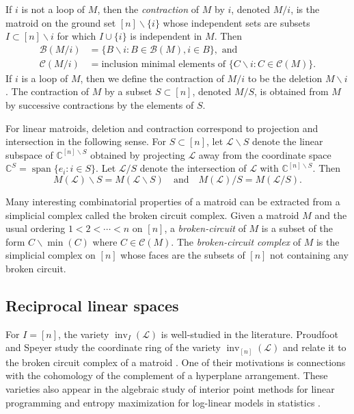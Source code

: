 \documentclass[ALCO,ThmDefs,Unicode,epreuves]{cedram}
\newcommand{\Cbb}{\mathbb{C}}
\newcommand{\cL}{\mathcal{L}}
\newcommand{\CC}{\mathcal{C}}
\newcommand{\B}{\mathcal{B}}
\DeclareMathOperator{\inv}{inv}
\DeclareMathOperator{\spanrm}{span}
\newcommand{\reldp}{\mathrel{:}}
\begin{document}
If $i$ is not a loop of $M$, then the \emph{contraction} of $M$ by $i$, denoted $M/ i $, is the matroid
on the ground set $[n]\backslash \{i\}$ whose independent sets are subsets $I\subset [n]\backslash i$ 
for which $I\cup \{i\}$ is independent in $M$. 
Then 
\begin{align*}
\B(M/ i) &= \{B\backslash i \reldp B \in \B (M), i\in B \}, \text{ and } \\
\CC (M/ i) & = \text{inclusion minimal elements of }\{C\backslash i \reldp C\in \CC (M) \}. 
\end{align*}
If $i$ is a loop of $M$, then we define the contraction of $M/i$ to be the deletion $M\backslash i$. 
The contraction of $M$ by a subset $S\subset [n]$, denoted $M/ S$, is obtained from $M$ by 
successive contractions by the elements of $S$. 


For linear matroids, deletion and contraction correspond to projection and intersection in the following sense. 
For $S\subset [n]$, let $\cL\backslash S$ denote the linear subspace of $\Cbb^{[n]\backslash S}$ obtained by projecting $\cL$ away 
from the coordinate space $\Cbb^S = \spanrm \{e_i : i\in S\}$. 
Let $\cL/S$ denote the intersection of $\cL$ with $\Cbb^{[n]\backslash S}$. Then 
\[ M(\cL)\backslash S = M(\cL\backslash S) 
\quad \text{and} \quad 
M(\cL)/S = M(\cL/S). 
\]

Many interesting combinatorial properties of a matroid can be extracted from a simplicial complex 
called the broken circuit complex. Given a matroid $M$ and the usual ordering $1<2< \cdots <n$ on $[n]$, 
a \emph{broken-circuit} of $M$ is a subset of the form $C\backslash \min(C)$ where $C\in \CC (M)$. 
The \emph{broken-circuit complex} of $M$ is the simplicial complex on $[n]$ whose faces are 
the subsets of $[n]$ not containing any broken circuit. 

\subsection{Reciprocal linear spaces}
For $I = [n]$, the variety $\inv_I(\cL)$ is well-studied in the literature. 
Proudfoot and Speyer study the coordinate ring of the variety $\inv_{[n]}(\cL)$ and relate it to the broken circuit complex of a matroid \cite{PS}. 
One of their motivations is connections with the cohomology of the complement of a hyperplane arrangement. 
These varieties also appear in the algebraic study of interior point methods for linear programming \cite{DLSV12} and entropy maximization for 
log-linear models in statistics \cite{MSUZ14}. 
\end{document}
